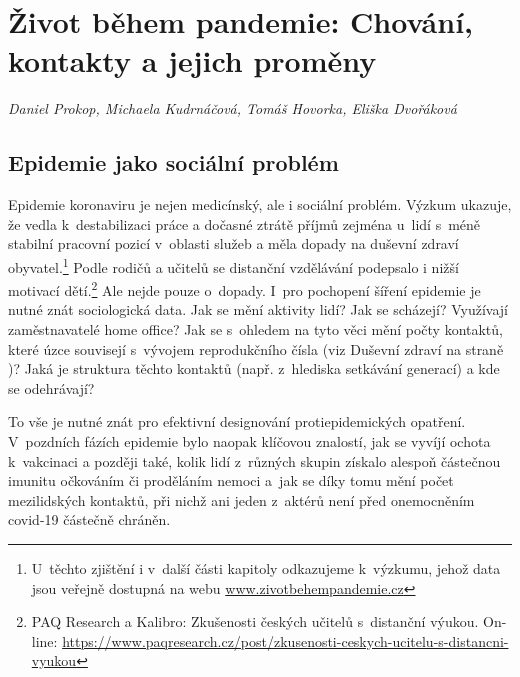 \chapter[Život během pandemie: Chování a kontakty]{Život během pandemie: Chování, kontakty a jejich proměny}\label{Zmeny_chovani}

\textit{Daniel Prokop, Michaela Kudrnáčová, Tomáš Hovorka, Eliška Dvořáková}
\vspace{15mm}

\section*{Epidemie jako sociální problém}

Epidemie koronaviru je nejen medicínský, ale i sociální problém. Výzkum  ukazuje, že vedla k destabilizaci práce a dočasné ztrátě příjmů zejména u~lidí s méně stabilní pracovní pozicí v oblasti služeb a měla dopady na duševní zdraví obyvatel.\footnote{U těchto zjištění i v další části kapitoly odkazujeme k výzkumu, jehož data jsou veřejně dostupná na webu \url{www.zivotbehempandemie.cz}}  Podle rodičů a učitelů se distanční vzdělávání podepsalo i nižší motivací dětí.\footnote{PAQ Research a Kalibro: Zkušenosti českých učitelů s~distanční výukou. On-line: \url{https://www.paqresearch.cz/post/zkusenosti-ceskych-ucitelu-s-distancni-vyukou}} Ale nejde pouze o~dopady. I~pro pochopení šíření epidemie je nutné znát sociologická data. Jak se mění aktivity lidí? Jak se scházejí? Využívají zaměstnavatelé home office? Jak se s ohledem na tyto věci mění počty kontaktů, které úzce souvisejí s vývojem reprodukčního čísla (viz Duševní zdraví na straně \pageref{Dusevni_zdravi})? Jaká je struktura těchto kontaktů (např. z~hlediska setkávání generací) a kde se odehrávají?

To vše je nutné znát pro efektivní designování protiepidemických opatření. V pozd\-ních fázích epidemie bylo naopak klíčovou znalostí, jak se vyvíjí ochota k vakcinaci a později také, kolik lidí z různých skupin získalo alespoň částečnou imunitu očkováním či proděláním nemoci a jak se díky tomu mění počet mezilidských kontaktů, při nichž ani jeden z aktérů není před onemocněním covid-19 částečně chráněn.

